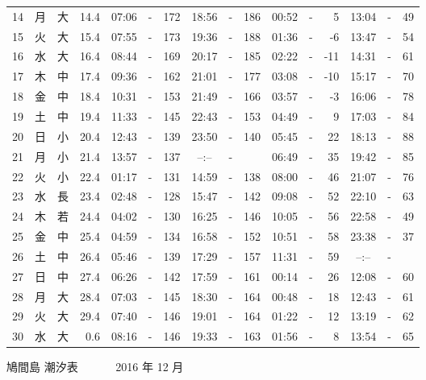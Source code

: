 \documentclass[12pt.a4j]{jsarticle}
\begin{document}
\begin{center}
\begin{table}[ht]
\begin{tabular}{|rc|cr|ccrccr|ccrccr|}
14 & 月 & 大 & 14.4 &  07:06 &-& 172  &  18:56 &-& 186  &   00:52 &-&   5  &   13:04 &-&  49  \\
15 & 火 & 大 & 15.4 &  07:55 &-& 173  &  19:36 &-& 188  &   01:36 &-&  -6  &   13:47 &-&  54  \\
16 & 水 & 大 & 16.4 &  08:44 &-& 169  &  20:17 &-& 185  &   02:22 &-& -11  &   14:31 &-&  61  \\
17 & 木 & 中 & 17.4 &  09:36 &-& 162  &  21:01 &-& 177  &   03:08 &-& -10  &   15:17 &-&  70  \\
18 & 金 & 中 & 18.4 &  10:31 &-& 153  &  21:49 &-& 166  &   03:57 &-&  -3  &   16:06 &-&  78  \\
19 & 土 & 中 & 19.4 &  11:33 &-& 145  &  22:43 &-& 153  &   04:49 &-&   9  &   17:03 &-&  84  \\
20 & 日 & 小 & 20.4 &  12:43 &-& 139  &  23:50 &-& 140  &   05:45 &-&  22  &   18:13 &-&  88  \\
21 & 月 & 小 & 21.4 &  13:57 &-& 137  &  --:-- &-&     &   06:49 &-&  35  &   19:42 &-&  85  \\
22 & 火 & 小 & 22.4 &  01:17 &-& 131  &  14:59 &-& 138  &   08:00 &-&  46  &   21:07 &-&  76  \\
23 & 水 & 長 & 23.4 &  02:48 &-& 128  &  15:47 &-& 142  &   09:08 &-&  52  &   22:10 &-&  63  \\
24 & 木 & 若 & 24.4 &  04:02 &-& 130  &  16:25 &-& 146  &   10:05 &-&  56  &   22:58 &-&  49  \\
25 & 金 & 中 & 25.4 &  04:59 &-& 134  &  16:58 &-& 152  &   10:51 &-&  58  &   23:38 &-&  37  \\
26 & 土 & 中 & 26.4 &  05:46 &-& 139  &  17:29 &-& 157  &   11:31 &-&  59  &   --:-- &-&     \\
27 & 日 & 中 & 27.4 &  06:26 &-& 142  &  17:59 &-& 161  &   00:14 &-&  26  &   12:08 &-&  60  \\
28 & 月 & 大 & 28.4 &  07:03 &-& 145  &  18:30 &-& 164  &   00:48 &-&  18  &   12:43 &-&  61  \\
29 & 火 & 大 & 29.4 &  07:40 &-& 146  &  19:01 &-& 164  &   01:22 &-&  12  &   13:19 &-&  62  \\
30 & 水 & 大 &  0.6 &  08:16 &-& 146  &  19:33 &-& 163  &   01:56 &-&   8  &   13:54 &-&  65  \\
   \hline
   \end{tabular}
\end{table}
\newpage
 {\LARGE 鳩間島  潮汐表　　　}
 {\large 2016 年 12 月}\\
 \begin{table}[ht]

\end{table}
\end{center}
\end{document}
